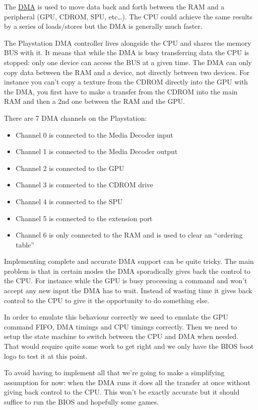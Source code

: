 \documentclass[a4paper]{article}
\begin{document}
The \href{https://en.wikipedia.org/wiki/Direct_memory_access}{DMA} is
used to move data back and forth between the RAM and a peripheral
(GPU, CDROM, SPU, etc\dots{}). The CPU could achieve the same results
by a series of loads/stores but the DMA is generally much faster.

The Playstation DMA controller lives alongside the CPU and shares the
memory BUS with it. It means that while the DMA is busy transferring
data the CPU is stopped: only one device can access the BUS at a given
time. The DMA can only copy data between the RAM and a device, not
directly between two devices.  For instance you can't copy a texture
from the CDROM directly into the GPU with the DMA, you first have to
make a transfer from the CDROM into the main RAM and then a 2nd one
between the RAM and the GPU.

There are 7 DMA channels on the Playstation:

\begin{itemize}
\item Channel 0 is connected to the Media Decoder input
\item Channel 1 is connected to the Media Decoder output
\item Channel 2 is connected to the GPU
\item Channel 3 is connected to the CDROM drive
\item Channel 4 is connected to the SPU
\item Channel 5 is connected to the extension port
\item Channel 6 is only connected to the RAM and is used to clear an
  ``ordering table''
\end{itemize}


Implementing complete and accurate DMA support can be quite
tricky. The main problem is that in certain modes the DMA sporadically
gives back the control to the CPU. For instance while the GPU is busy
processing a command and won't accept any new input the DMA has to
wait. Instead of wasting time it gives back control to the CPU to give
it the opportunity to do something else.

In order to emulate this behaviour correctly we need to emulate the
GPU command FIFO, DMA timings and CPU timings correctly. Then we need
to setup the state machine to switch between the CPU and DMA when
needed. That would require quite some work to get right and we only
have the BIOS boot logo to test it at this point.

To avoid having to implement all that we're going to make a
simplifying assumption for now: when the DMA runs it does all the
transfer at once without giving back control to the CPU. This won't be
exactly accurate but it should suffice to run the BIOS and hopefully
some games.
\end{document}
